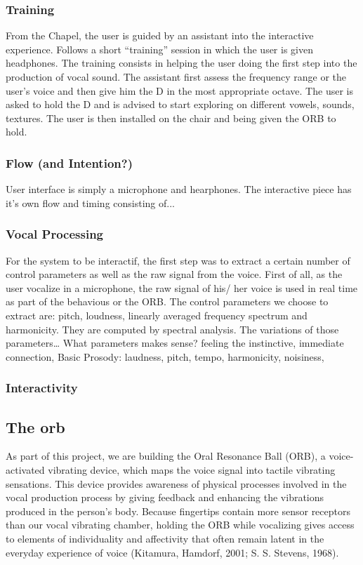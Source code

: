 \documentclass{nime-alternate}
\begin{document}
\subsubsection{Training}
From the Chapel, the user is guided by an assistant into the interactive experience. Follows a short “training” session in which the user is given headphones. The training consists in helping the user doing the first step into the production of vocal sound. The assistant first assess the frequency range or the user’s voice and then give him the D in the most appropriate octave. The user is asked to hold the D and is advised to start exploring on different vowels, sounds, textures. The user is then installed on the chair and being given the ORB to hold.
 
\subsubsection{Flow  (and Intention?)}
User interface is simply a microphone and hearphones. The interactive piece has it’s own flow and timing consisting of...

\subsubsection{Vocal Processing}
For the system to be interactif, the first step was to extract a certain number of control parameters as well as the raw signal from the voice. First of all, as the user vocalize in a microphone, the raw signal of his/ her voice is used in real time as part of the behavious or the ORB. The control parameters we choose to extract are: pitch, loudness, linearly averaged frequency spectrum and harmonicity. They are computed by spectral analysis. The variations of those parameters…
What parameters makes sense? feeling the instinctive, immediate connection, 
Basic Prosody: laudness, pitch, tempo, harmonicity, noisiness, 

\subsubsection{Interactivity}

\subsection{The orb}

As part of this project, we are building the Oral Resonance Ball (ORB), a voice-activated vibrating device, which maps the voice signal into tactile vibrating sensations. This device provides awareness of physical processes involved in the vocal production process by giving feedback and enhancing the vibrations produced in the person’s body. Because fingertips contain more sensor receptors than our vocal vibrating chamber, holding the ORB while vocalizing gives access to elements of individuality and affectivity that often remain latent in the everyday experience of voice (Kitamura, Hamdorf, 2001; S. S. Stevens, 1968).
\end{document}
